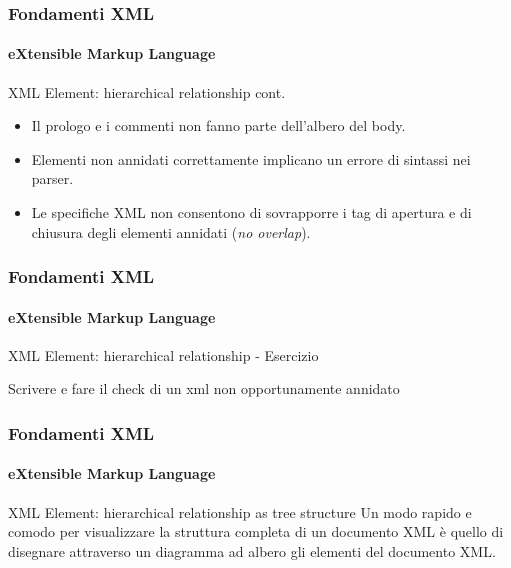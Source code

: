 \begin{frame}
    \frametitle{Fondamenti XML}
    \framesubtitle{eXtensible Markup Language}
    \addtocounter{nframe}{1}

	\begin{block}{XML Element: hierarchical relationship cont.}
		\begin{itemize}
			\item Il prologo e i commenti non fanno parte dell'albero del body.
			\item Elementi non annidati correttamente implicano un errore di sintassi nei parser.
			\item Le specifiche XML non consentono di sovrapporre i tag di apertura e di chiusura degli elementi annidati (\textit{no overlap}).
		\end{itemize}
	\end{block}

\end{frame}


\begin{frame}
    \frametitle{Fondamenti XML}
    \framesubtitle{eXtensible Markup Language}
    \addtocounter{nframe}{1}

	\begin{block}{XML Element: hierarchical relationship - Esercizio}
		\begin{center}
			Scrivere e fare il check di un xml non opportunamente annidato
		\end{center}
	\end{block}

\end{frame}


\begin{frame}
    \frametitle{Fondamenti XML}
    \framesubtitle{eXtensible Markup Language}
    \addtocounter{nframe}{1}

	\begin{block}{XML Element: hierarchical relationship as tree structure}
		Un modo rapido e comodo per visualizzare la struttura completa di un documento XML è quello di disegnare attraverso un diagramma ad albero gli elementi del documento XML.
	\end{block}

\end{frame}

